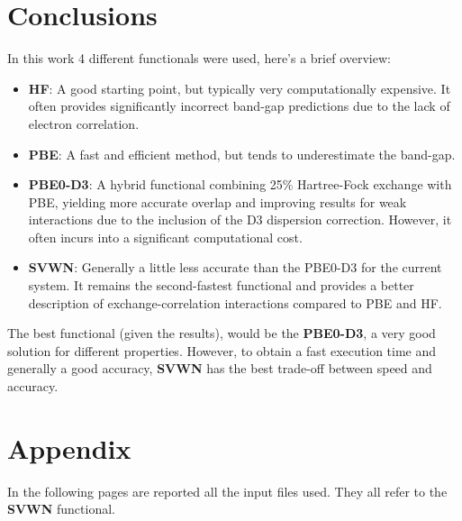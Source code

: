 \documentclass{article}
\begin{document}
\newpage
\section{Conclusions}
In this work 4 different functionals were used, here's a brief overview:
\begin{itemize}
	\item \textbf{HF}: A good starting point, but typically very computationally expensive. It often provides significantly incorrect band-gap predictions due to the lack of electron correlation.
	\item \textbf{PBE}: A fast and efficient method, but tends to underestimate the band-gap.
	\item \textbf{PBE0-D3}: A hybrid functional combining 25\% Hartree-Fock exchange with PBE, yielding more accurate overlap and improving results for weak interactions due to the inclusion of the D3 dispersion correction. However, it often incurs into a significant computational cost.
	\item \textbf{SVWN}: Generally a little less accurate than the PBE0-D3 for the current system. It remains the second-fastest functional and provides a better description of exchange-correlation interactions compared to PBE and HF.
\end{itemize}

\noindent The best functional (given the results), would be the \textbf{PBE0-D3}, a very good solution for different properties. However, to obtain a fast execution time and generally a good accuracy, \textbf{SVWN} has the best trade-off between speed and accuracy.

\newpage
\section{Appendix}

In the following pages are reported all the input files used. They all refer to the \textbf{SVWN} functional.

\vspace{20pt}
\end{document}
